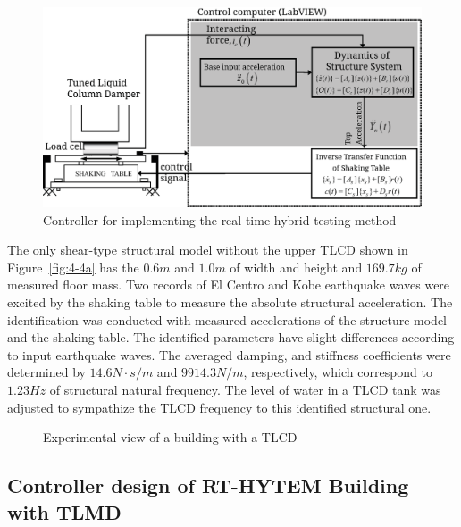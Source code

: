 \begin{figure}[ht]
\centering
\includegraphics[width=1\textwidth] {figure/4-3.eps}
\caption{Controller for implementing the real-time hybrid testing method}
\label{fig:4-3}
\end{figure}

The only shear-type structural model without the upper TLCD shown in Figure~\ref{fig:4-4a} has the $0.6m$ and $1.0m$ of width and height and $169.7kg$ of measured floor mass. Two records of El Centro and Kobe earthquake waves were excited by the shaking table to measure the absolute structural acceleration. The identification was conducted with measured accelerations of the structure model and the shaking table. The identified parameters have slight differences according to input earthquake waves. The averaged damping, and stiffness coefficients were determined by $14.6N\cdot s/m$ and $9914.3N/m$, respectively, which correspond to $1.23Hz$ of structural natural frequency. The level of water in a TLCD tank was adjusted to sympathize the TLCD frequency to this identified structural one.

\begin{figure}[!ht]
\centering
{}
\caption{Experimental view of a building with a TLCD}
\label{fig:4-4}
\end{figure}






\subsection{Controller design of RT-HYTEM Building with TLMD}

